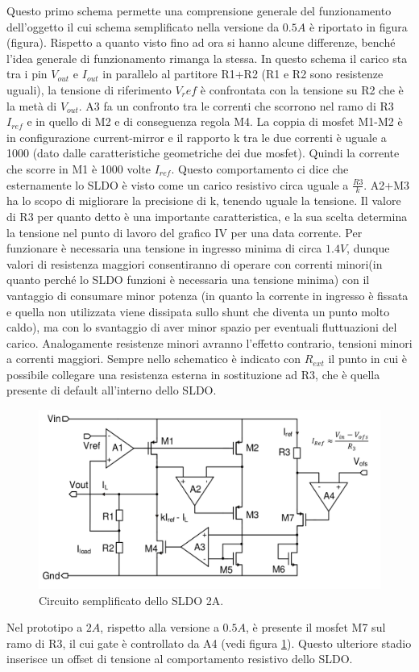 Questo primo schema permette una comprensione generale del funzionamento dell'oggetto il cui schema semplificato nella versione da $0.5 A$ è riportato in figura (figura). Rispetto a quanto visto fino ad ora si hanno alcune differenze, benché l'idea generale di funzionamento rimanga la stessa. 
In questo schema il carico sta tra i pin $V_{out}$ e $I_{out}$ in parallelo al partitore R1+R2 (R1 e R2 sono resistenze uguali), la tensione di riferimento $V_ref$ è confrontata con la tensione su R2 che è la metà di $V_{out}$. A3 fa un confronto tra le correnti che scorrono nel ramo di R3 $I_{ref}$ e in quello di M2 e di conseguenza regola M4. La coppia di mosfet M1-M2 è in configurazione current-mirror e il rapporto k tra le due correnti è uguale a 1000 (dato dalle caratteristiche geometriche dei due mosfet). 
Quindi la corrente che scorre in M1 è 1000 volte $I_{ref}$. Questo comportamento ci dice che esternamente lo SLDO è visto come un carico resistivo circa uguale a $\frac{R3}{k}$. A2+M3 ha lo scopo di migliorare la precisione di k, tenendo uguale la tensione. Il valore di R3 per quanto detto è una importante caratteristica, e la sua scelta determina la tensione nel punto di lavoro del grafico IV per una data corrente. 
Per funzionare è necessaria una tensione in ingresso minima di circa $1.4V$, dunque valori di resistenza maggiori consentiranno di operare con correnti minori(in quanto perché lo SLDO funzioni è necessaria una tensione minima) con il vantaggio di consumare minor potenza (in quanto la corrente in ingresso è fissata e quella non utilizzata viene dissipata sullo shunt che diventa un punto molto caldo), ma con lo svantaggio di aver minor spazio per eventuali fluttuazioni del carico. 
Analogamente resistenze minori avranno l'effetto contrario, tensioni minori a correnti maggiori.
Sempre nello schematico è indicato con $R_{ext}$ il punto in cui è possibile collegare una resistenza esterna in sostituzione ad R3, che è quella presente di default all'interno dello SLDO.
\begin{figure}
\centering
\includegraphics[scale=.3]{Immagini/SLDO2A}
\caption{Circuito semplificato dello SLDO 2A.}
\label{SLDO2A}
\end{figure}
Nel prototipo a $2A$, rispetto alla versione a $0.5A$, è presente il mosfet M7 sul ramo di R3, il cui gate è controllato da A4 (vedi figura \ref{SLDO2A}). Questo ulteriore stadio inserisce un offset di tensione al comportamento resistivo dello SLDO.

